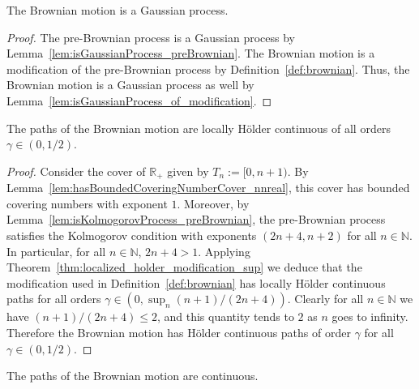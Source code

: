 \begin{lemma}\label{lem:isGaussianProcess_brownian}
  \leanok
The Brownian motion is a Gaussian process.
\end{lemma}

\begin{proof}\leanok
The pre-Brownian process is a Gaussian process by Lemma~\ref{lem:isGaussianProcess_preBrownian}.
The Brownian motion is a modification of the pre-Brownian process by Definition~\ref{def:brownian}.
Thus, the Brownian motion is a Gaussian process as well by Lemma~\ref{lem:isGaussianProcess_of_modification}.
\end{proof}


\begin{lemma}\label{lem:isHolderWith_brownian}
  \leanok
The paths of the Brownian motion are locally Hölder continuous of all orders $\gamma \in (0, 1/2)$.
\end{lemma}

\begin{proof}\leanok
Consider the cover of $\mathbb{R}_+$ given by $T_n := [0, n + 1)$. By Lemma~\ref{lem:hasBoundedCoveringNumberCover_nnreal}, this cover has bounded covering numbers with exponent $1$. Moreover, by Lemma~\ref{lem:isKolmogorovProcess_preBrownian}, the pre-Brownian process satisfies the Kolmogorov condition with exponents $(2n + 4, n + 2)$ for all $n \in \mathbb{N}$.
In particular, for all $n \in \mathbb{N}$, $2n + 4 > 1$. Applying Theorem~\ref{thm:localized_holder_modification_sup} we deduce that the modification used in Definition~\ref{def:brownian} has locally Hölder continuous paths for all orders $\gamma \in (0, \sup_n (n + 1) / (2n + 4))$.
Clearly for all $n \in \mathbb{N}$ we have $(n + 1) / (2n + 4) \leqslant 2$, and this quantity tends to $2$ as $n$ goes to infinity. Therefore the Brownian motion has Hölder continuous paths of order $\gamma$ for all $\gamma \in (0, 1 / 2)$.
\end{proof}


\begin{lemma}\label{lem:continuous_brownian}
  \leanok
The paths of the Brownian motion are continuous.
\end{lemma}

